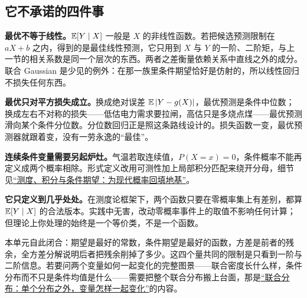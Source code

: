 \subsection{它不承诺的四件事}

\textbf{最优不等于线性。}\(\mathbb{E}[Y\mid X]\) 一般是 \(X\) 的非线性函数。若把候选预测限制在 \(aX+b\) 之内，得到的是最佳线性预测，它只用到 \(X\) 与 \(Y\) 的一阶、二阶矩，与上一节的相关系数是同一个层次的东西。两者之差衡量依赖关系中直线之外的成分。联合 Gaussian 是少见的例外：在那一族里条件期望恰好是仿射的，所以线性回归不损失任何东西。

\textbf{最优只对平方损失成立。}换成绝对误差 \(\mathbb{E}\left|Y-g(X)\right|\)，最优预测是条件中位数；换成左右不对称的损失——低估电力需求要拉闸，高估只是多烧点煤——最优预测滑向某个条件分位数。分位数回归正是照这条路线设计的。损失函数一变，最优预测器就跟着变，没有一劳永逸的``最佳''。

\textbf{连续条件变量需要另起炉灶。}气温若取连续值，\(P(X=x)=0\)，条件概率不能再定义成两个概率相除。形式定义改用可测性加上局部积分匹配来绕开分母，细节见\hyperref[ch:101]{``测度、积分与条件期望：为现代概率回填地基''}。

\textbf{它只定义到几乎处处。}在测度论框架下，两个函数只要在零概率集上有差别，都算 \(\mathbb{E}[Y\mid X]\) 的合法版本。实践中无害，改动零概率事件上的取值不影响任何计算；但理论上你处理的始终是一个等价类，不是一个函数。

本单元自此闭合：期望是最好的常数，条件期望是最好的函数，方差是前者的残余，全方差分解说明后者把残余削掉了多少。这四个量共同的限制是只看到一阶与二阶信息。若要问两个变量如何一起变化的完整图景——联合密度长什么样，条件分布而不只是条件均值是什么——需要把整个联合分布搬上台面，那是\hyperref[ch:041]{``联合分布：单个分布之外，变量怎样一起变化''}的内容。
